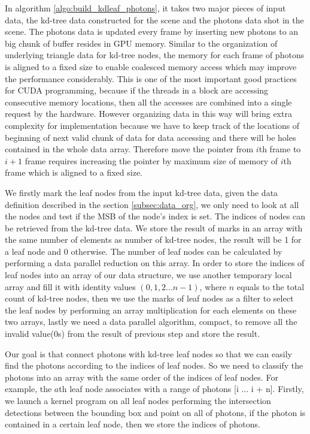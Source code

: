 In algorithm \ref{algo:build_kdleaf_photons}, it takes two major pieces of input data, the kd-tree data constructed for the scene and the photons data shot in the scene. The photons data is updated every frame by inserting new photons to an big chunk of buffer resides in GPU memory. Similar to the organization of underlying triangle data for kd-tree nodes, the memory for each frame of photons is aligned to a fixed size to enable coalesced memory access which may improve the performance considerably. This is one of the most important good practices for CUDA programming, because if the threads in a block are accessing consecutive memory locations, then all the accesses are combined into a single request by the hardware. However organizing data in this way will bring extra complexity for implementation because we have to keep track of the locations of beginning of next valid chunk of data for data accessing and there will be holes contained in the whole data array. Therefore move the pointer from \(i\)th frame to \(i+1\) frame requires increasing the pointer by maximum size of memory of \(i\)th frame which is aligned to a fixed size. 

We firstly mark the leaf nodes from the input kd-tree data, given the data definition described in the section \ref{subsec:data_org}, we only need to look at all the nodes and test if the MSB of the node's index is set. The indices of nodes can be retrieved from the kd-tree data. We store the result of marks in an array with the same number of elements as number of kd-tree nodes, the result will be 1 for a leaf node and 0 otherwise. The number of leaf nodes can be calculated by performing a data parallel reduction on this array. In order to store the indices of leaf nodes into an array of our data structure, we use another temporary local array and fill it with identity values \( (0, 1, 2 ... n-1) \), where \(n\) equals to the total count of kd-tree nodes, then we use the marks of leaf nodes as a filter to select the leaf nodes by performing an array multiplication for each elements on these two arrays, lastly we need a data parallel algorithm, compact, to remove all the invalid value(0s) from the result of previous step and store the result. 

Our goal is that connect photons with kd-tree leaf nodes so that we can easily find the photons according to the indices of leaf nodes. So we need to classify the photons into an array with the same order of the indices of leaf nodes. For example, the \(a\)th leaf node associates with a range of photons [i ... i + n]. Firstly, we launch a kernel program on all leaf nodes performing the intersection detections between the bounding box and point on all of photons, if the photon is contained in a certain leaf node, then we store the indices of photons. 

